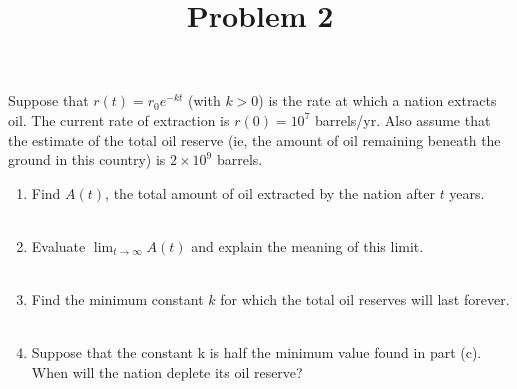 \documentclass{ximera}
\title[Problem 2]{Problem 2}
\begin{document}
\begin{abstract} \end{abstract}
\maketitle

\begin{problem}

Suppose that $r(t) = r_0 e^{-kt}$ (with $k>0$) is the rate at which a nation extracts oil.
The current rate of extraction is $r(0) = 10^7$ barrels/yr.
Also assume that the estimate of the total oil reserve (ie, the amount of oil remaining beneath the ground in this country) is $2 \times 10^9$ barrels.

	\begin{enumerate}

	\item  Find $A(t)$, the total amount of oil extracted by the nation after $t$ years.\\ \\
		\item  Evaluate $\lim_{t \to \infty} A(t)$ and explain the meaning of this limit.\\ \\
	\item  Find the minimum constant $k$ for which the total oil reserves will last forever.\\ \\
		\item  Suppose that the  constant k is half the minimum value found in part (c). When will the nation deplete its oil reserve?\\ \\
		\end{enumerate}
\end{problem}
\end{document}
